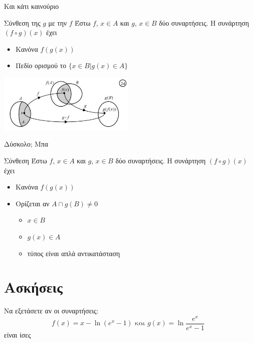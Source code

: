 \documentclass{presentation}
\begin{document}
\begin{frame}{Και κάτι καινούριο}
      \begin{block}{Σύνθεση της $g$ με την $f$}
            Έστω $f$, $x\in Α$ και $g$, $x\in Β$ δύο συναρτήσεις. Η συνάρτηση $(f\circ g)(x)$ έχει
            \begin{itemize}
                  \item Κανόνα $f(g(x))$
                  \item Πεδίο ορισμού το $\{x\in Β | g(x)\in Α \}$
            \end{itemize}
      \end{block}
      \centering
      \includegraphics[width=0.5\textwidth]{"images/1.2 Σύνθεση.png"}
\end{frame}

\begin{frame}{Δύσκολο; Μπα}
      \begin{block}{Σύνθεση}
            Έστω $f$, $x\in Α$ και $g$, $x\in Β$ δύο συναρτήσεις. Η συνάρτηση $(f\circ g)(x)$ έχει
            \begin{itemize}
                  \item Κανόνα $f(g(x))$
                  \item Ορίζεται αν $Α\cap g(Β)\ne 0$
                        \begin{itemize}
                              \item<2-> $x\in Β$
                              \item<3-> $g(x)\in Α$
                              \item<4-> τύπος είναι απλά αντικατάσταση
                        \end{itemize}
            \end{itemize}
      \end{block}
\end{frame}

\section{Ασκήσεις}

\begin{askisi}
      Να εξετάσετε αν οι συναρτήσεις:
      $$f(x)=x-\ln (e^x-1) \text{ και } g(x)=\ln\frac{e^x}{e^x-1}$$
      είναι ίσες

\end{askisi}
\end{document}
